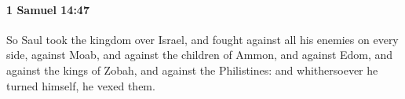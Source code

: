 
		\paragraph{1 Samuel 14:47} %
			\label{1SAMUEL-14-47}

			So Saul took the kingdom over Israel, and fought against all his enemies on every side, against Moab, and against the children of Ammon, and against Edom, and against the kings of Zobah, and against the Philistines: and whithersoever he turned himself, he vexed them.


